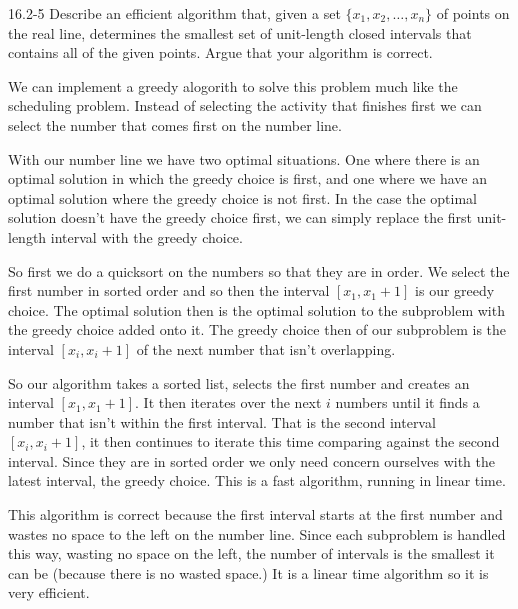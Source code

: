 





\homeworkheader{\classnameandsection}

\begin{problem}{16.2-5}
  Describe an efficient algorithm that, given a set $\{ x_1,x_2,\ldots, x_n \}$ of points on the real line, determines
  the smallest set of unit-length closed intervals that contains all of the given points. Argue that your algorithm is
  correct.
  \begin{solution}
    We can implement a greedy alogorith to solve this problem much like the scheduling problem. Instead of selecting the
    activity that finishes first we can select the number that comes first on the number line.

    With our number line we have two optimal situations. One where there is an optimal solution in which the greedy
    choice is first, and one where we have an optimal solution where the greedy choice is not first. In the case the
    optimal solution doesn't have the greedy choice first, we can simply replace the first unit-length interval with the
    greedy choice.

    So first we do a quicksort on the numbers so that they are in order. We select the first number in sorted order and
    so then the interval $[x_1, x_1 + 1]$ is our greedy choice. The optimal solution then is the optimal solution to the
    subproblem with the greedy choice added onto it. The greedy choice then of our subproblem is the interval $[x_i, x_i
    + 1]$ of the next number that isn't overlapping.

    So our algorithm takes a sorted list, selects the first number and creates an interval $[x_1, x_1 + 1]$. It then
    iterates over the next $i$ numbers until it finds a number that isn't within the first interval. That is the second
    interval $[x_i, x_i + 1]$, it then continues to iterate this time comparing against the second interval. Since they
    are in sorted order we only need concern ourselves with the latest interval, the greedy choice. This is a fast
    algorithm, running in linear time.

    This algorithm is correct because the first interval starts at the first number and wastes no space to the left on
    the number line. Since each subproblem is handled this way, wasting no space on the left, the number of intervals is
    the smallest it can be (because there is no wasted space.) It is a linear time algorithm so it is very efficient.
  \end{solution}
\end{problem}

